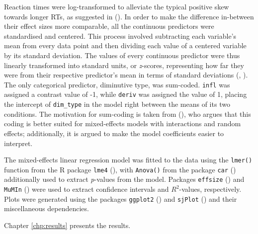 Reaction times were log-transformed to alleviate the typical positive skew towards longer RTs, as suggested in \citeauthor{Winter+2019} (\citeyear{Winter+2019}). In order to make the difference in-between their effect sizes more comparable, all the continuous predictors were standardised and centered. This process involved subtracting each variable's mean from every data point and then dividing each value of a centered variable by its standard deviation. The values of every continuous predictor were thus linearly transformed into standard units, or \textit{z}-scores, representing how far they were from their respective predictor's mean in terms of standard deviations (\citeauthor{Winter+2019}, \citeyear{Winter+2019}). The only categorical predictor, diminutive type, was sum-coded. \texttt{infl} was assigned a contrast value of -1, while \texttt{deriv} was assigned the value of 1, placing the intercept of \texttt{dim\_type} in the model right between the means of its two conditions. The motivation for sum-coding is taken from \citeauthor{Winter+2019} (\citeyear{Winter+2019}), who argues that this coding is better suited for mixed-effects models with interactions and random effects; additionally, it is argued to make the model coefficients easier to interpret.

The mixed-effects linear regression model was fitted to the data using the \texttt{lmer()} function from the R package \texttt{lme4} (\cite{lme4+2015}), with \texttt{Anova()} from the package \texttt{car} (\cite{car+2019}) additionally used to extract \textit{p}-values from the model. Packages \texttt{effsize} (\cite{effsize+2020}) and \texttt{MuMIn} (\cite{MuMIn+2022}) were used to extract confidence intervals and $R^2$-values, respectively. Plots were generated using the packages \texttt{ggplot2} (\cite{ggplot2+2016}) and \texttt{sjPlot} (\cite{sjplot+2022}) and their miscellaneous dependencies.

Chapter \ref{chp:results} presents the results.